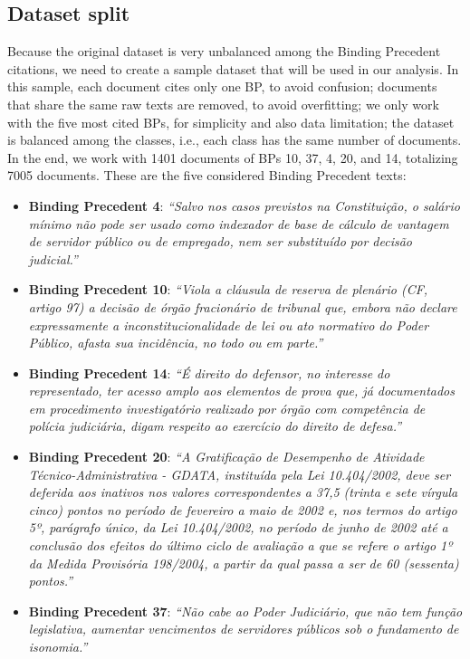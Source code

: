 \documentclass[twocolumn]{article}
\begin{document}
            \subsection{Dataset split}

                  Because the original dataset is very unbalanced among the Binding Precedent citations, we need to create a sample dataset that will be used in our analysis. In this sample, each document cites only one BP, to avoid confusion; documents that share the same raw texts are removed, to avoid overfitting; we only work with the five most cited BPs, for simplicity and also data limitation; the dataset is balanced among the classes, i.e., each class has the same number of documents. In the end, we work with 1401 documents of BPs 10, 37, 4, 20, and 14, totalizing 7005 documents. These are the five considered Binding Precedent texts:

                  \begin{itemize}
                        \item \textbf{Binding Precedent 4}: \textit{``Salvo nos casos previstos na Constituição, o salário mínimo não pode ser usado como indexador de base de cálculo de vantagem de servidor público ou de empregado, nem ser substituído por decisão judicial.''}
                        \item \textbf{Binding Precedent 10}: \textit{``Viola a cláusula de reserva de plenário (CF, artigo 97) a decisão de órgão fracionário de tribunal que, embora não declare expressamente a inconstitucionalidade de lei ou ato normativo do Poder Público, afasta sua incidência, no todo ou em parte.''}
                        \item \textbf{Binding Precedent 14}: \textit{``É direito do defensor, no interesse do representado, ter acesso amplo aos elementos de prova que, já documentados em procedimento investigatório realizado por órgão com competência de polícia judiciária, digam respeito ao exercício do direito de defesa.''}
                        \item \textbf{Binding Precedent 20}: \textit{``A Gratificação de Desempenho de Atividade Técnico-Administrativa - GDATA, instituída pela Lei 10.404/2002, deve ser deferida aos inativos nos valores correspondentes a 37,5 (trinta e sete vírgula cinco) pontos no período de fevereiro a maio de 2002 e, nos termos do artigo 5º, parágrafo único, da Lei 10.404/2002, no período de junho de 2002 até a conclusão dos efeitos do último ciclo de avaliação a que se refere o artigo 1º da Medida Provisória 198/2004, a partir da qual passa a ser de 60 (sessenta) pontos.''}
                        \item \textbf{Binding Precedent 37}: \textit{``Não cabe ao Poder Judiciário, que não tem função legislativa, aumentar vencimentos de servidores públicos sob o fundamento de isonomia.''}
                  \end{itemize}
\end{document}
